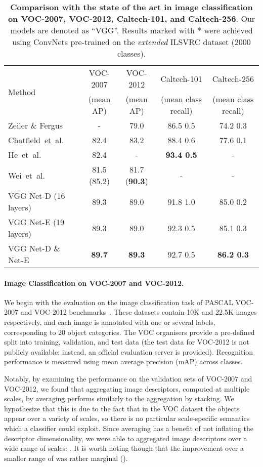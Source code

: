 \documentclass{article} \usepackage{iclr2015,times}
\makeatletter
\newcommand*{\etal}{et~al.\@\xspace}
\makeatother
\begin{document}
\begin{table}[htb]
\setlength{\tabcolsep}{2pt}
\small
\centering
\caption{\textbf{Comparison with the state of the art in image classification on VOC-2007, VOC-2012, Caltech-101, and Caltech-256}.
Our models are denoted as ``VGG''. 
Results marked with * were achieved using \mbox{ConvNets} pre-trained on the \emph{extended} ILSVRC dataset (2000 classes).
}
\begin{tabular}{|l|c|c|c|c|} \hline
\multirow{2}{*}{Method} & VOC-2007 & VOC-2012 & Caltech-101 & Caltech-256  \\ 
& (mean AP) & (mean AP) & (mean class recall) & (mean class recall) \\ \hline
Zeiler \& Fergus~\citep{Zeiler13} & - & 79.0 & 86.5  0.5 & 74.2  0.3 \\ 
Chatfield~\etal~\citep{Chatfield14} & 82.4 & 83.2 & 88.4  0.6 & 77.6  0.1 \\ 
He~\etal~\citep{He14} & 82.4 & - & \textbf{93.4  0.5} & - \\ 
Wei~\etal~\citep{Wei14} & 81.5 (85.2) & 81.7 (\textbf{90.3}) & - & - \\ \hline\hline
VGG Net-D (16 layers) & 89.3 & 89.0 & 91.8  1.0 & 85.0  0.2 \\ 
VGG Net-E (19 layers) & 89.3 & 89.0 & 92.3  0.5 & 85.1  0.3 \\
VGG Net-D \& Net-E & \textbf{89.7} & \textbf{89.3} & 92.7  0.5 & \textbf{86.2  0.3} \\ \hline
\end{tabular}
\label{tab:generalise_class}
\end{table}


\paragraph{Image Classification on VOC-2007 and VOC-2012.}
We begin with the evaluation on the image classification task of PASCAL VOC-2007 and VOC-2012 benchmarks~\citep{Everingham15}. These datasets contain 10K and 22.5K images respectively, and each image is annotated with one or several labels, corresponding to 20 object categories. The VOC organisers provide a pre-defined split into training, validation, and test data (the test data for VOC-2012 is not publicly available; instead, an official evaluation server is provided). Recognition performance is measured using mean average precision (mAP) across classes.


Notably, by examining the performance on the validation sets of \mbox{VOC-2007} and VOC-2012, we found that aggregating image descriptors, computed at multiple scales, by averaging performs similarly to the aggregation by stacking.
We hypothesize that this is due to the fact that in the VOC dataset the objects appear over a variety of scales, so there is no particular scale-specific semantics which a classifier could exploit.
Since averaging has a benefit of not inflating the descriptor dimensionality, we were able to aggregated image descriptors over a wide range of scales: . It is worth noting though that the improvement over a smaller range of  was rather marginal ().
\end{document}
